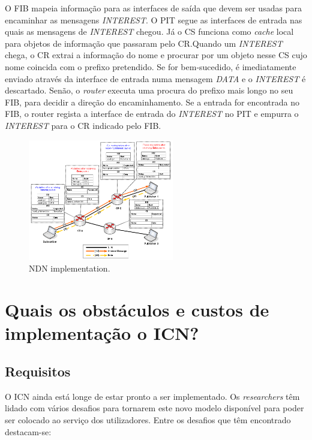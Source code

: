 \documentclass[conference]{IEEEtran}
\begin{document}
O FIB mapeia informa\c{c}\~{a}o para as interfaces de sa\'{i}da que devem ser usadas para encaminhar as mensagens \textit{INTEREST}. O PIT segue as interfaces de entrada nas quais as mensagens de \textit{INTEREST} chegou. J\'{a} o CS funciona como \textit{cache} local para objetos de informa\c{c}\~{a}o que passaram pelo CR.Quando um \textit{INTEREST} chega, o CR extrai a informa\c{c}\~{a}o do nome e procurar por um objeto nesse CS cujo nome coincida com o prefixo pretendido. Se for bem-sucedido, \'{e} imediatamente enviado atrav\'{e}s da interface de entrada numa mensagem \textit{DATA} e o \textit{INTEREST} \'{e} descartado. Sen\~{a}o, o \textit{router} executa uma procura do prefixo mais longo no seu FIB, para decidir a dire\c{c}\~{a}o do encaminhamento. Se a entrada for encontrada no FIB, o router regista a interface de entrada do \textit{INTEREST} no PIT e empurra o \textit{INTEREST} para o CR indicado pelo FIB.\\

\begin{figure}[h]
\centering
\includegraphics[width=2.5in]{ndn}
\caption{NDN implementation.}
\label{dona}
\end{figure}

\section{Quais os obst\'{a}culos e custos de implementa\c{c}\~{a}o o ICN?}

\subsection{Requisitos}

O ICN ainda est\'{a} longe de estar pronto a ser implementado. Os \textit{researchers} t\^{e}m lidado com v\'{a}rios desafios para tornarem este novo modelo dispon\'{i}vel para poder ser colocado ao servi\c{c}o dos utilizadores. Entre os desafios que t\^{e}m encontrado destacam-se:\\
\end{document}

